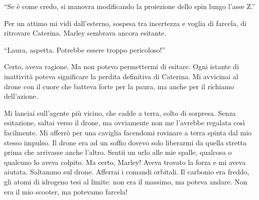 \begin{dialogue}
 \enquote{Se è come credo,  si manovra modificando la proiezione dello spin lungo l’asse Z.}
\end{dialogue}

Per un attimo mi vidi dall'esterno, sospesa tra incertezza e voglia di farcela, di ritrovare Caterina. Marley sembrava ancora esitante.

\begin{dialogue}
 \enquote{Laura, aspetta. Potrebbe essere troppo pericoloso!}
\end{dialogue}

Certo, aveva ragione. Ma non potevo permettermi di esitare. Ogni istante di inattività poteva significare la perdita definitiva di Caterina. Mi avvicinai al drone con il cuore che batteva forte per la paura, ma anche per il richiamo dell'azione.

Mi lanciai sull'agente più vicino, che cadde a terra, colto di sorpresa. Senza esitazione, saltai verso il drone, ma ovviamente non me l'avrebbe regalata così facilmente. Mi afferrò per una caviglia facendomi rovinare a terra spinta dal mio stesso impulso. Il drone era ad un soffio dovevo solo liberarmi da quella stretta prima che arrivasse anche l'altro. Sentii un urlo alle mie spalle, qualcosa o qualcuno lo aveva colpito. Ma certo, Marley! Aveva trovato la forza e mi aveva aiutata. Saltammo  sul drone.  Afferrai i comandi orbitali. Il carbonio era freddo, gli atomi di idrogeno tesi al limite: non era il massimo, ma poteva andare. Non era il mio scooter, ma potevamo farcela!




